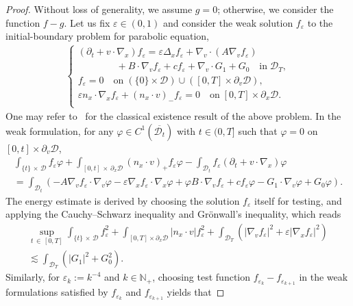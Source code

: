 \documentclass[AHL,Unicode,longabstracts,published]{cedram}
\newcommand*\p{\partial}
\newcommand*\N {\mathbb{N}}
\newcommand*\D {\mathcal{D}}
\begin{document}
\begin{proof}
Without loss of generality, we assume $g=0$; otherwise, we consider the function $f-g$. Let us fix $\varepsilon\in(0,1)$ and consider the weak solution $f_\varepsilon$ to the initial-boundary problem for parabolic equation,
\begin{align*}
\begin{cases}
(\partial_t+v\cdot\nabla_x)f_\varepsilon =\varepsilon\Delta_xf_\varepsilon + \nabla_v\cdot(A\nabla_v f_\varepsilon)\\
\qquad\qquad+ B\cdot\nabla_vf_\varepsilon +cf_\varepsilon + \nabla_v\cdot G_1 + G_0 \quad\text{in}\; \D_T, \\
f_\varepsilon= 0 \quad\text{on}\; (\{0\}\times\D)\cup([0,T]\times\p_v\D), \\
\varepsilon n_x\cdot\nabla_xf_\varepsilon + (n_x\cdot v)_-f_\varepsilon = 0 \quad\text{on}\; [0,T]\times\p_x\D. \\
\end{cases}
\end{align*}
One may refer to~\cite[III. \S~5]{Lady} for the classical existence result of the above problem. In the weak formulation, for any $\varphi\in C^1(\overline{\D_t})$ with $t\in(0,T]$ such that $\varphi=0$ on $[0,t]\times\p_v\D$,
\begin{multline}\label{FPeweak}
\int_{\{t\}\,\times\,\D}f_\varepsilon\varphi + \int_{[0,t]\,\times\,\p_x\D} (n_x\cdot v)_+f_\varepsilon\varphi -\int_{\D_t}f_\varepsilon\left(\p_t+v\cdot\nabla_x\right)\varphi \\
=\int_{\D_t} \left(-A\nabla_vf_\varepsilon\cdot\nabla_v\varphi-\varepsilon\nabla_xf_\varepsilon\cdot\nabla_x\varphi + \varphi B\cdot\nabla_vf_\varepsilon + c f_\varepsilon\varphi - G_1\cdot\nabla_v\varphi + G_0\varphi\right).
\end{multline}
The energy estimate is derived by choosing the solution $f_\varepsilon$ itself for testing, and applying the Cauchy--Schwarz inequality and Gr\"onwall's inequality, which reads
\begin{multline*}
\sup_{t\,\in\,[0,T]} \int_{\{t\}\,\times\,\D} f_\varepsilon^2 + \int_{[0,T]\times\p_x\D} \left|n_x\cdot v\right| f_\varepsilon^2 + \int_{\D_T} \left(\left|\nabla_vf_\varepsilon\right|^2 + \varepsilon
\left|\nabla_xf_\varepsilon\right|^2\right)\\
\lesssim \int_{\D_T} \left(|G_1|^2 +G_0^2\right).
\end{multline*}
Similarly, for $\varepsilon_k:=k^{-4}$ and $k\in\N_+$, choosing test function $f_{\varepsilon_{k}}-f_{\varepsilon_{k+1}}$ in the weak formulations satisfied by $f_{\varepsilon_{k}}$ and $f_{\varepsilon_{k+1}}$ yields that

\end{proof}
\end{document}

